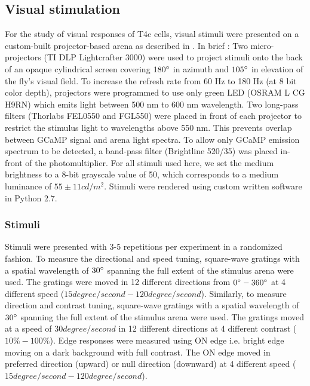 \documentclass[9pt,lineno]{elife}
\begin{document}
\subsection{Visual stimulation}
For the study of visual responses of T4c cells, visual stimuli were presented on a custom-built projector-based arena as described in \parencite{Arenz2017}. In brief : Two micro-projectors (TI DLP Lightcrafter 3000) were used to project stimuli onto the back of an opaque cylindrical screen covering $180\degree$ in azimuth and $105\degree$ in elevation of the fly's visual field. To increase the refresh rate from 60 Hz to 180 Hz (at 8 bit color depth), projectors were programmed to use only green LED (OSRAM L CG H9RN) which emits light between 500 nm to 600 nm wavelength. Two long-pass filters (Thorlabs FEL0550 and FGL550) were placed in front of each projector to restrict the stimulus light to wavelengths above 550 nm. This prevents overlap between GCaMP signal and arena light spectra. To allow only GCaMP emission spectrum to be detected, a band-pass filter (Brightline 520/35) was placed in-front of the photomultiplier. For all stimuli used here, we set the medium brightness to a 8-bit grayscale value of 50, which corresponds to a medium luminance of $55 \pm 11 cd/m^2$. Stimuli were rendered using custom written software in Python 2.7. 

\subsubsection{Stimuli}
Stimuli were presented with 3-5 repetitions per experiment in a randomized fashion. To measure the directional and speed tuning, square-wave gratings with a spatial wavelength of $30\degree$ spanning the full extent of the stimulus arena were used. The gratings were moved in 12 different directions from $0\degree - 360\degree$ at 4 different speed ($15degree/second - 120degree/second$). Similarly, to measure direction and contrast tuning, square-wave gratings with a spatial wavelength of $30\degree$ spanning the full extent of the stimulus arena were used. The gratings moved at a speed of $30degree/second$ in 12 different directions at 4 different contrast ($10\% - 100\%$). Edge responses were measured using ON edge i.e. bright edge moving on a dark background with full contrast. The ON edge moved in preferred direction (upward) or null direction (downward) at 4 different speed ($15degree/second - 120degree/second$).
\end{document}
